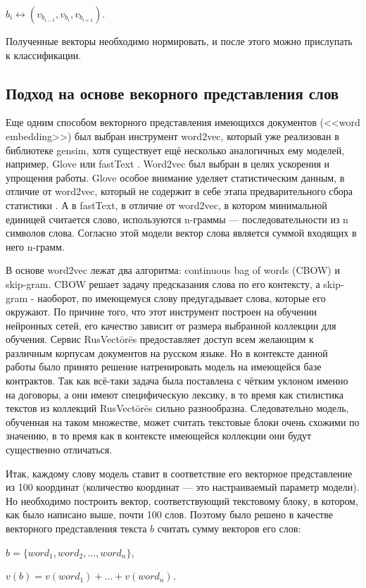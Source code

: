 \documentclass[12pt]{article}
\begin{document}
\begin{center}
	$b_i \leftrightarrow (v_{b_{i-1}}, v_{b_i}, v_{b_{i+1}})$.
\end{center}

Полученные векторы необходимо нормировать, и после этого можно прислупать к классификации.

\subsection{Подход на основе векорного представления слов}

Еще одним способом векторного представления имеющихся документов (<<word embedding>>) был выбран инструмент word2vec, который уже реализован в библиотеке gensim, хотя существует ещё несколько аналогичных ему моделей, например, Glove \cite{glove} или fastText \cite{fasttext}. Word2vec был выбран в целях ускорения и упрощения работы. Glove особое внимание уделяет статистическим данным, в отличие от word2vec, который не содержит в себе этапа предварительного сбора статистики \cite{zakirov, predict}. А в fastText, в отличие от word2vec, в котором минимальной единицей считается слово, используются n-граммы — последовательности из n символов слова. Согласно этой модели вектор слова является суммой входящих в него n-грамм.

В основе word2vec лежат два алгоритма: continuous bag of words (CBOW) и skip-gram. CBOW решает задачу предсказания слова по его контексту, а skip-gram - наоборот, по имеющемуся слову предугадывает слова, которые его окружают. По причине того, что этот инструмент построен на обучении нейронных сетей, его качество зависит от размера выбранной коллекции для обучения. Сервис RusVectōrēs предоставляет доступ всем желающим к различным корпусам документов на русском языке. Но в контексте данной работы было принято решение натренировать модель на имеющейся базе контрактов. Так как всё-таки задача была поставлена с чётким уклоном именно на договоры, а они имеют специфическую лексику, в то время как стилистика текстов из коллекций RusVectōrēs сильно разнообразна. Следовательно модель, обученная на таком множестве, может считать текстовые блоки очень схожими по значению, в то время как в контексте имеющейся коллекции они будут существенно отличаться. 

Итак, каждому слову модель ставит в соответствие его векторное представление из 100 координат (количество координат --- это настраиваемый параметр модели). Но необходимо построить вектор, соответствующий текстовому блоку, в котором, как было написано выше, почти 100 слов. Поэтому было решено в качестве векторного представления текста $b$ считать сумму векторов его слов:
\begin{center}
$b = \{word_1, word_2, …, word_n\}$,

$v(b) = v(word_1) +\ldots + v(word_n)$.
\end{center}
\end{document}
